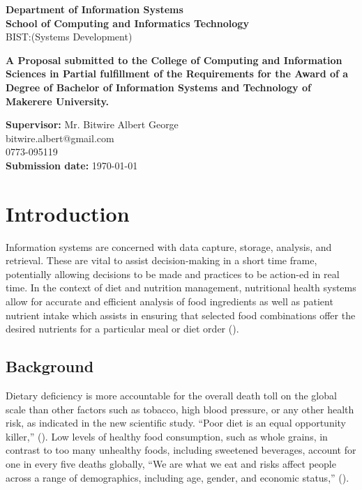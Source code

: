 \documentclass{article}
\begin{document}
\begin{center}
\begin{center}
\textbf{Department of Information Systems}\\
\textbf{School of Computing and Informatics Technology}
\\ BIST:(Systems Development)
\end{center}

\begin{center}
\textbf{A Proposal submitted to the College of Computing and Information Sciences in Partial fulfillment of the Requirements for the Award of a Degree of Bachelor of Information Systems and Technology of Makerere University.}
\end{center}

\vspace{3pt} 
\textbf{Supervisor:} Mr. Bitwire Albert George \\
 bitwire.albert@gmail.com \\ 0773-095119 \\
\textbf{Submission date:} \today

\end{center}

\newpage
\tableofcontents
\newpage
\listoftables
\newpage
\listoffigures
\newpage

\section{Introduction}
\label{Introducion}
Information systems are concerned with data capture, storage, analysis, and retrieval. These are vital to assist decision-making in a short time frame, potentially allowing decisions to be made and practices to be action-ed in real time.  In the context of diet and nutrition management, nutritional health systems allow for accurate and efficient analysis of food ingredients as well as patient nutrient intake which assists in ensuring that selected food combinations offer the desired nutrients for a particular meal or diet order (\cite{DFM}). 


\subsection{Background}
\label{Background}
Dietary deficiency is more accountable for the overall death toll on the global scale than other factors such as tobacco, high blood pressure, or any other health risk, as indicated in the new scientific study. “Poor diet is an equal opportunity killer,” (\cite{ihme2019new}). Low levels of healthy food consumption, such as whole grains, in contrast to too many unhealthy foods, including sweetened beverages, account for one in every five deaths globally, “We are what we eat and risks affect people across a range of demographics, including age, gender, and economic status,” (\cite{ihme2019new}).
\end{document}
